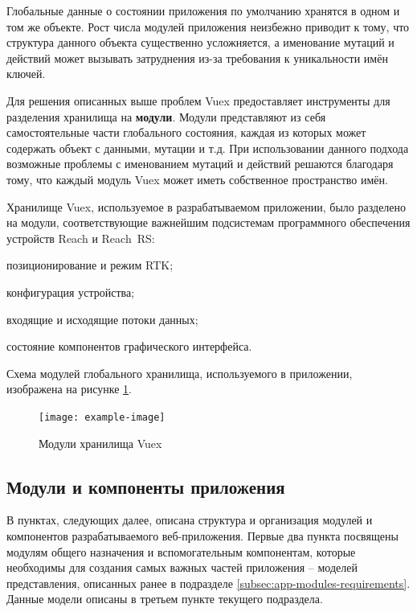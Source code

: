 Глобальные данные о состоянии приложения по умолчанию хранятся в одном и том же объекте. Рост числа модулей приложения неизбежно приводит к тому, что структура данного объекта существенно усложняется, а именование мутаций и действий может вызывать затруднения из-за требования к уникальности имён ключей.

Для решения описанных выше проблем Vuex предоставляет инструменты для разделения хранилища на \textbf{модули}. Модули представляют из себя самостоятельные части глобального состояния, каждая из которых может содержать объект с данными, мутации и т.д. При использовании данного подхода возможные проблемы с именованием мутаций и действий решаются благодаря тому, что каждый модуль Vuex может иметь собственное пространство имён.


Хранилище Vuex, используемое в разрабатываемом приложении, было разделено на модули, соответствующие важнейшим подсистемам программного обеспечения устройств Reach и Reach~RS:
\begin{dashitemize}
  \item позиционирование и режим RTK;
  \item конфигурация устройства;
  \item входящие и исходящие потоки данных;
  \item состояние компонентов графического интерфейса.
\end{dashitemize}

Схема модулей глобального хранилища, используемого в приложении, изображена на рисунке \ref{fig:vuex-modules}.

\begin{figure}[h!]
  \centering
  \setlength{\fboxsep}{5pt}
  \texttt{[image: example-image]}
  \vspace*{12pt}
  \caption{Модули хранилища Vuex}\label{fig:vuex-modules}
\end{figure}



\subsection{Модули и компоненты приложения}

В пунктах, следующих далее, описана структура и организация модулей и компонентов разрабатываемого веб-приложения. Первые два пункта посвящены модулям общего назначения и вспомогательным компонентам, которые необходимы для создания самых важных частей приложения -- моделей представления, описанных ранее в подразделе \ref{subsec:app-modules-requirements}. Данные модели описаны в третьем пункте текущего подраздела.



